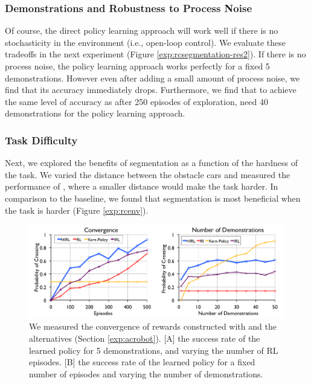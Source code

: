 \subsubsection{Demonstrations and Robustness to Process Noise}\label{exp:ppr} Of course, the direct policy learning approach will work well if there is no stochasticity in the environment (i.e., open-loop control).
We evaluate these tradeoffs in the next experiment (Figure \ref{exp:rcsegmentation-res2}). 
If there is no process noise, the policy learning approach works perfectly for a fixed 5 demonstrations.
However even after adding a small amount of process noise, we find that its accuracy immediately drops.
Furthermore, we find that to achieve the same level of accuracy as \hirl after 250 episodes of exploration, need 40 demonstrations for the policy learning approach.

\subsubsection{Task Difficulty}\label{exp:ppd} Next, we explored the benefits of segmentation as a function of the hardness of the task.
We varied the distance between the obstacle cars and measured the performance of \hirl, where a smaller distance would make the task harder.
In comparison to the baseline, we found that segmentation is most beneficial when the task is harder (Figure \ref{exp:rcenv}). 

\begin{figure}[t]
\centering
 \includegraphics[width=\columnwidth]{exp/acrobot-segmentation-1ab.png}
 \caption{We measured the convergence of rewards constructed with \hirl and the alternatives (Section \ref{exp:acrobot}).
 [A] the success rate of the learned policy for 5 demonstrations, and varying the number of RL episodes. 
 [B] the success rate of the learned policy for a fixed number of episodes and varying the number of demonstrations.  \label{exp:acsegmentation-res2}}
\end{figure}

